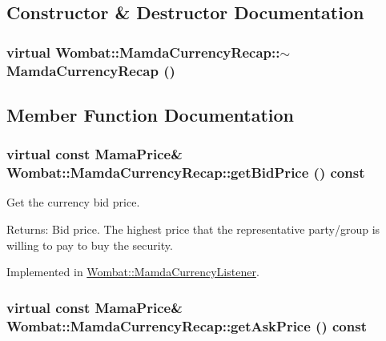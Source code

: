 \subsection{Constructor \& Destructor Documentation}
\hypertarget{classWombat_1_1MamdaCurrencyRecap_800867345be123689025daed5db9bd8d}{
\subsubsection[$\sim$MamdaCurrencyRecap]{\setlength{\rightskip}{0pt plus 5cm}virtual Wombat::Mamda\-Currency\-Recap::$\sim$Mamda\-Currency\-Recap ()}}
\label{classWombat_1_1MamdaCurrencyRecap_800867345be123689025daed5db9bd8d}




\subsection{Member Function Documentation}
\hypertarget{classWombat_1_1MamdaCurrencyRecap_bce12f317bf48ecab3175f6d1581f853}{
\subsubsection[getBidPrice]{\setlength{\rightskip}{0pt plus 5cm}virtual const Mama\-Price\& Wombat::Mamda\-Currency\-Recap::get\-Bid\-Price () const}}
\label{classWombat_1_1MamdaCurrencyRecap_bce12f317bf48ecab3175f6d1581f853}


Get the currency bid price. 

\begin{Desc}
\item[Returns:]Bid price. The highest price that the representative party/group is willing to pay to buy the security. \end{Desc}


Implemented in \hyperlink{classWombat_1_1MamdaCurrencyListener_3563aac40f16c6dd61f64e9d9c2e1b2e}{Wombat::Mamda\-Currency\-Listener}.\hypertarget{classWombat_1_1MamdaCurrencyRecap_7f59a08ae952cfc742c9530d343784b7}{
\subsubsection[getAskPrice]{\setlength{\rightskip}{0pt plus 5cm}virtual const Mama\-Price\& Wombat::Mamda\-Currency\-Recap::get\-Ask\-Price () const}}
\label{classWombat_1_1MamdaCurrencyRecap_7f59a08ae952cfc742c9530d343784b7}


